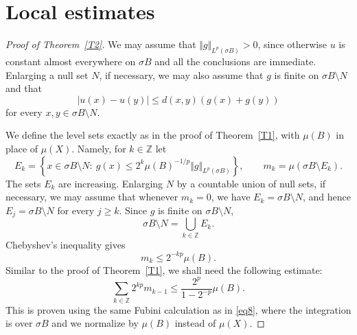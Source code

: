 \documentclass[12pt,leqno]{amsart}
\theoremstyle{definition}
\newcommand{\bbbz}{\mathbb Z}
\numberwithin{theorem}{section} \numberwithin{equation}{section}
\begin{document}
\section{Local estimates}

\begin{proof}[Proof of Theorem~\ref{T2}]
We may assume that $\Vert g\Vert_{L^p(\sigma B)}>0$, since otherwise $u$ is constant almost everywhere on $\sigma B$ and all the conclusions are immediate. Enlarging a null set $N$, if necessary, we may also assume that $g$ is finite on $\sigma B\setminus N$ and that
\[
 |u(x)-u(y)|\leq d(x,y)(g(x)+g(y))
\]
for every $x,y\in\sigma B\setminus N$.

We define the level sets exactly as in the proof of Theorem~\ref{T1}, with $\mu(B)$ in place of $\mu(X)$. Namely, for $k\in\bbbz$ let
\[
 E_k=\left\{x\in\sigma B\setminus N:\
 g(x)\leq 2^k\mu(B)^{-1/p}\Vert g\Vert_{L^p(\sigma B)}\right\},
 \qquad
 m_k=\mu(\sigma B\setminus E_k).
\]
The sets $E_k$ are increasing. Enlarging $N$ by a countable union of null sets, if necessary, we may assume that whenever $m_k=0$, we have $E_k=\sigma B\setminus N$, and hence $E_j=\sigma B\setminus N$ for every $j\geq k$. Since $g$ is finite on $\sigma B\setminus N$,
\[
 \sigma B\setminus N=\bigcup_{k\in\bbbz}E_k.
\]
Chebyshev's inequality gives
\begin{equation}
\label{eq21}
 m_k\leq 2^{-kp}\mu(B).
\end{equation}
Similar to the proof of Theorem~\ref{T1}, we shall need the following estimate:
\begin{equation}
\label{eq22}
 \sum_{k\in\bbbz}2^{kp}m_{k-1}
 \leq \frac{2^p}{1-2^{-p}}\mu(B).
\end{equation}
This is proven using the same Fubini calculation as in \eqref{eq8}, where the integration is over $\sigma B$ and we normalize by $\mu(B)$ instead of $\mu(X)$.



\end{proof}
\end{document}
